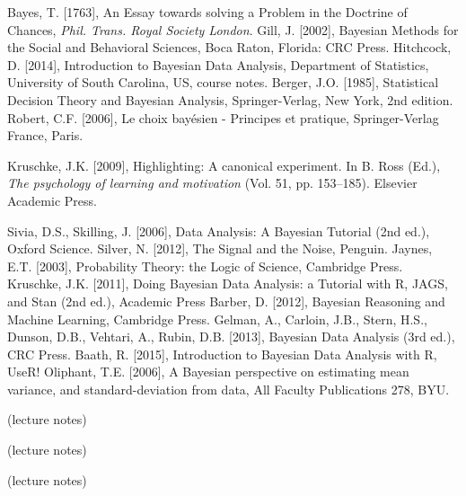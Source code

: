 \begin{thebibliography}{99}

 Bayes, T. [1763], An Essay towards solving a Problem in the Doctrine of Chances, {\it Phil. Trans. Royal Society London}.
 Gill, J. [2002],  Bayesian Methods for the Social and Behavioral Sciences, Boca Raton, Florida: CRC Press.  
Hitchcock, D. [2014], Introduction to Bayesian Data Analysis, Department of Statistics, University of South Carolina, US,  course notes.  
 Berger, J.O. [1985],  Statistical Decision Theory and Bayesian Analysis, Springer-Verlag, New York, 2nd edition.
 Robert, C.F. [2006], Le choix bay\'esien - Principes et pratique, Springer-Verlag France, Paris.

 Kruschke, J.K. [2009], Highlighting: A canonical experiment. In B. Ross (Ed.), \textit{The psychology of learning and motivation} (Vol. 51, pp. 153–185). Elsevier  Academic Press. 

 Sivia, D.S., Skilling, J. [2006], Data Analysis: A Bayesian Tutorial (2nd ed.), Oxford Science.
 Silver, N. [2012], The Signal and the Noise, Penguin.
 Jaynes, E.T. [2003], Probability Theory: the Logic of Science, Cambridge Press. 
 Kruschke, J.K. [2011], Doing Bayesian Data Analysis: a Tutorial with R, JAGS, and Stan (2nd ed.), Academic Press
 Barber, D. [2012], Bayesian Reasoning and Machine Learning, Cambridge Press.
 Gelman, A., Carloin, J.B., Stern, H.S., Dunson, D.B., Vehtari, A., Rubin, D.B. [2013], Bayesian Data Analysis (3rd ed.), CRC Press.
 Baath, R. [2015], Introduction to Bayesian Data Analysis with R, UseR!
 Oliphant, T.E. [2006], A Bayesian perspective on estimating mean variance, and standard-deviation from data, All Faculty Publications 278, BYU. 

  (lecture notes)

 (lecture notes)

 (lecture notes)

 


\end{thebibliography}
